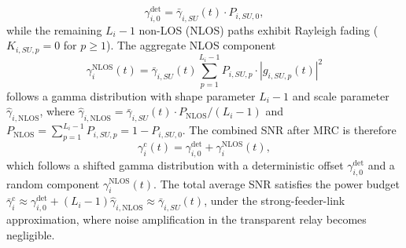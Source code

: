 \documentclass[lettersize,journal]{IEEEtran}
\begin{document}
\begin{equation}
\gamma_{i,0}^{\mathrm{det}} = \bar{\gamma}_{i,SU}(t) \cdot P_{i,SU,0},
\label{eq:los_deterministic}
\end{equation}
while the remaining $L_i - 1$ non-LOS (NLOS) paths exhibit Rayleigh fading ($K_{i,SU,p} = 0$ for $p \geq 1$). The aggregate NLOS component
\begin{equation}
\gamma_i^{\mathrm{NLOS}}(t) = \bar{\gamma}_{i,SU}(t) \sum_{p=1}^{L_i-1} P_{i,SU,p} \cdot |g_{i,SU,p}(t)|^2
\label{eq:nlos_aggregate}
\end{equation}
follows a gamma distribution with shape parameter $L_i - 1$ and scale parameter $\hat{\gamma}_{i,\mathrm{NLOS}}$, where $\hat{\gamma}_{i,\mathrm{NLOS}} = \bar{\gamma}_{i,SU}(t) \cdot P_{\mathrm{NLOS}} / (L_i - 1)$ and $P_{\mathrm{NLOS}} = \sum_{p=1}^{L_i-1} P_{i,SU,p} = 1 - P_{i,SU,0}$. The combined SNR after MRC is therefore
\begin{equation}
\gamma_i^{\mathrm{c}}(t) = \gamma_{i,0}^{\mathrm{det}} + \gamma_i^{\mathrm{NLOS}}(t),
\label{eq:combined_snr_final}
\end{equation}
which follows a shifted gamma distribution with a deterministic offset $\gamma_{i,0}^{\mathrm{det}}$ and a random component $\gamma_i^{\mathrm{NLOS}}(t)$. The total average SNR satisfies the power budget
$\bar{\gamma}_i^{\mathrm{c}} \approx \gamma_{i,0}^{\mathrm{det}} + (L_i-1)\hat{\gamma}_{i,\mathrm{NLOS}} \approx \bar{\gamma}_{i,SU}(t)$,
under the strong-feeder-link approximation, where noise amplification in the transparent relay becomes negligible. 
\end{document}
